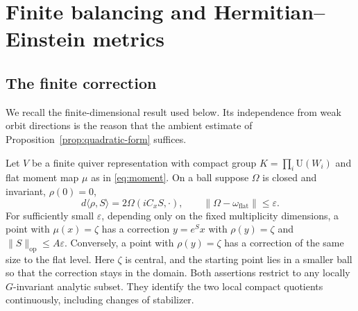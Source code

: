 \section{Finite balancing and Hermitian--Einstein metrics}\label{sec:metrics}

\subsection{The finite correction}
We recall the finite-dimensional result used below. Its independence
from weak orbit directions is the reason that the ambient estimate
of Proposition~\ref{prop:quadratic-form} suffices.

\begin{lemma}\label{lem:balancing}
Let $V$ be a finite quiver representation with compact group
$K=\prod_i\mathrm U(W_i)$ and flat moment map $\mu$ as in
\eqref{eq:moment}. On a ball suppose $\Omega$ is closed and invariant,
$\rho(0)=0$,
\[
 d\langle\rho,S\rangle=2\Omega(iC_xS,\cdot),\qquad
 \|\Omega-\omega_{\mathrm{flat}}\|\le\varepsilon .
\]
For sufficiently small $\varepsilon$, depending only on the fixed
multiplicity dimensions, a point with $\mu(x)=\zeta$ has a correction
$y=e^Sx$ with $\rho(y)=\zeta$ and $\|S\|_{\mathrm{op}}\le A\varepsilon$.
Conversely, a point with $\rho(y)=\zeta$ has a correction of the same
size to the flat level. Here $\zeta$ is central, and the starting
point lies in a smaller ball so that the correction stays in the domain.
Both assertions restrict to any locally $G$-invariant analytic subset.
They identify the two local compact quotients continuously, including
changes of stabilizer.
\end{lemma}


